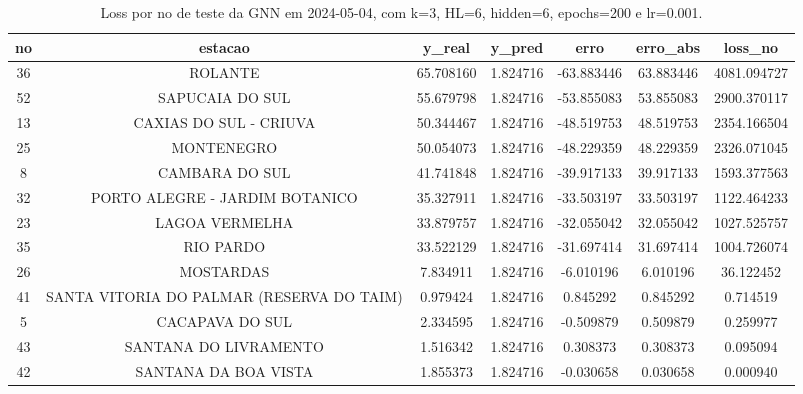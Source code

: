 \begin{table}[h]
\centering
\caption{Loss por no de teste da GNN em 2024-05-04, com k=3, HL=6, hidden=6, epochs=200 e lr=0.001.}
\label{tab:gnn_loss_k3_hl6_h6_e200_d20240504}
\begin{tabular}{ccccccc}
\toprule
no & estacao & y\_real & y\_pred & erro & erro\_abs & loss\_no \\
\midrule
36 & ROLANTE & 65.708160 & 1.824716 & -63.883446 & 63.883446 & 4081.094727 \\
52 & SAPUCAIA DO SUL & 55.679798 & 1.824716 & -53.855083 & 53.855083 & 2900.370117 \\
13 & CAXIAS DO SUL - CRIUVA & 50.344467 & 1.824716 & -48.519753 & 48.519753 & 2354.166504 \\
25 & MONTENEGRO & 50.054073 & 1.824716 & -48.229359 & 48.229359 & 2326.071045 \\
8 & CAMBARA DO SUL & 41.741848 & 1.824716 & -39.917133 & 39.917133 & 1593.377563 \\
32 & PORTO ALEGRE - JARDIM BOTANICO & 35.327911 & 1.824716 & -33.503197 & 33.503197 & 1122.464233 \\
23 & LAGOA VERMELHA & 33.879757 & 1.824716 & -32.055042 & 32.055042 & 1027.525757 \\
35 & RIO PARDO & 33.522129 & 1.824716 & -31.697414 & 31.697414 & 1004.726074 \\
26 & MOSTARDAS & 7.834911 & 1.824716 & -6.010196 & 6.010196 & 36.122452 \\
41 & SANTA VITORIA DO PALMAR (RESERVA DO TAIM) & 0.979424 & 1.824716 & 0.845292 & 0.845292 & 0.714519 \\
5 & CACAPAVA DO SUL & 2.334595 & 1.824716 & -0.509879 & 0.509879 & 0.259977 \\
43 & SANTANA DO LIVRAMENTO & 1.516342 & 1.824716 & 0.308373 & 0.308373 & 0.095094 \\
42 & SANTANA DA BOA VISTA & 1.855373 & 1.824716 & -0.030658 & 0.030658 & 0.000940 \\
\bottomrule
\end{tabular}
\end{table}
